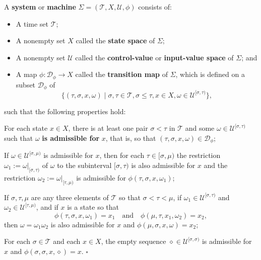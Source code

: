 \begin{definizione}
A \textbf{system} or \textbf{machine} $\Sigma = (\mathcal{T}, X, \mathcal{U}, \phi)$ consists of:
\begin{itemize}
	\item A time set $\mathcal{T}$;
	\item A nonempty set $X$ called the \textbf{state space} of $\Sigma$;
	\item A nonempty set $\mathcal{U}$ called the \textbf{control-value} or \textbf{input-value space} of $\Sigma$; and
	\item A map $\phi : \mathcal{D}_\phi \to X$ called the \textbf{transition map} of $\Sigma$, which is defined on a subset $\mathcal{D}_\phi$ of
	\begin{equation}
		\{(\tau, \sigma, x, \omega) \mid \sigma, \tau \in \mathcal{T}, \sigma \le \tau, x \in X, \omega \in \mathcal{U}^{[\sigma, \tau)}\},
	\end{equation}
\end{itemize}
such that the following properties hold:

\medskip
\noindent {} For each state $x \in X$, there is at least one pair $\sigma < \tau$ in $\mathcal{T}$ and some $\omega \in \mathcal{U}^{[\sigma, \tau)}$ such that $\omega$ \textbf{is admissible for} $x$, that is, so that $(\tau, \sigma, x, \omega) \in \mathcal{D}_\phi$;

\medskip
\noindent {} If $\omega \in \mathcal{U}^{[\sigma, \mu)}$ is admissible for $x$, then for each $\tau \in [\sigma, \mu)$ the restriction $\omega_1 := \omega|_{[\sigma, \tau)}$ of $\omega$ to the subinterval $[\sigma, \tau)$ is also admissible for $x$ and the restriction $\omega_2 := \omega|_{[\tau, \mu)}$ is admissible for $\phi(\tau, \sigma, x, \omega_1)$;

\medskip
\noindent {} If $\sigma, \tau, \mu$ are any three elements of $\mathcal{T}$ so that $\sigma < \tau < \mu$, if $\omega_1 \in \mathcal{U}^{[\sigma, \tau)}$ and $\omega_2 \in \mathcal{U}^{[\tau, \mu)}$, and if $x$ is a state so that
\[ \phi(\tau, \sigma, x, \omega_1) = x_1 \quad \text{and} \quad \phi(\mu, \tau, x_1, \omega_2) = x_2, \]
then $\omega = \omega_1 \omega_2$ is also admissible for $x$ and $\phi(\mu, \sigma, x, \omega) = x_2$;

\medskip
\noindent {} For each $\sigma \in \mathcal{T}$ and each $x \in X$, the empty sequence $\diamond \in \mathcal{U}^{[\sigma, \sigma)}$ is admissible for $x$ and $\phi(\sigma, \sigma, x, \diamond) = x$. \hfill $\square$
\end{definizione}

